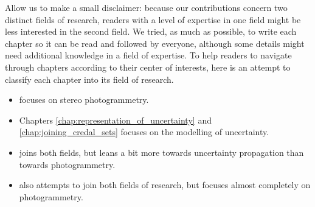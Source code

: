 Allow us to make a small disclaimer: because our contributions concern two distinct fields of research, readers with a level of expertise in one field might be less interested in the second field. We tried, as much as possible, to write each chapter so it can be read and followed by everyone, although some details might need additional knowledge in a field of expertise. To help readers to navigate through chapters according to their center of interests, here is an attempt to classify each chapter into its field of research.
\begin{itemize}
    \item {} focuses on stereo photogrammetry.
    \item Chapters \ref{chap:representation_of_uncertainty} and \ref{chap:joining_credal_sets} focuses on the modelling of uncertainty.
    \item {} joins both fields, but leans a bit more towards uncertainty propagation than towards photogrammetry. 
    \item {} also attempts to join both fields of research, but focuses almost completely on photogrammetry.
\end{itemize}

